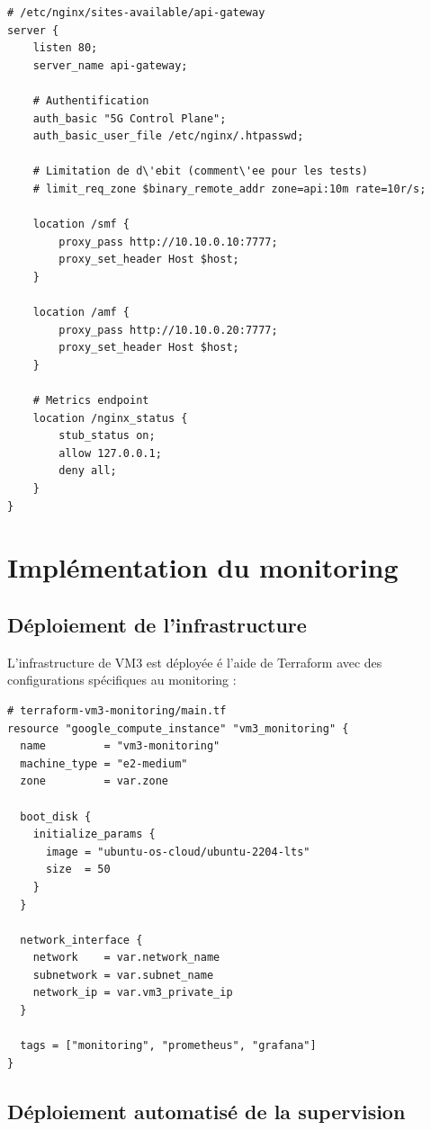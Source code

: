 \documentclass[12pt,a4paper]{report}
\begin{document}
\begin{lstlisting}[caption=API Gateway Configuration]
# /etc/nginx/sites-available/api-gateway
server {
    listen 80;
    server_name api-gateway;

    # Authentification
    auth_basic "5G Control Plane";
    auth_basic_user_file /etc/nginx/.htpasswd;

    # Limitation de d\'ebit (comment\'ee pour les tests)
    # limit_req_zone $binary_remote_addr zone=api:10m rate=10r/s;

    location /smf {
        proxy_pass http://10.10.0.10:7777;
        proxy_set_header Host $host;
    }

    location /amf {
        proxy_pass http://10.10.0.20:7777;
        proxy_set_header Host $host;
    }

    # Metrics endpoint
    location /nginx_status {
        stub_status on;
        allow 127.0.0.1;
        deny all;
    }
}
\end{lstlisting}

\section{Impl\'ementation du monitoring}

\subsection{D\'eploiement de l'infrastructure}

L'infrastructure de VM3 est déployée é l'aide de Terraform avec des configurations spécifiques au monitoring :

\begin{lstlisting}[caption=Configuration Terraform VM3]
# terraform-vm3-monitoring/main.tf
resource "google_compute_instance" "vm3_monitoring" {
  name         = "vm3-monitoring"
  machine_type = "e2-medium"
  zone         = var.zone

  boot_disk {
    initialize_params {
      image = "ubuntu-os-cloud/ubuntu-2204-lts"
      size  = 50
    }
  }

  network_interface {
    network    = var.network_name
    subnetwork = var.subnet_name
    network_ip = var.vm3_private_ip
  }

  tags = ["monitoring", "prometheus", "grafana"]
}
\end{lstlisting}

\subsection{Déploiement automatisé de la supervision}
\end{document}
